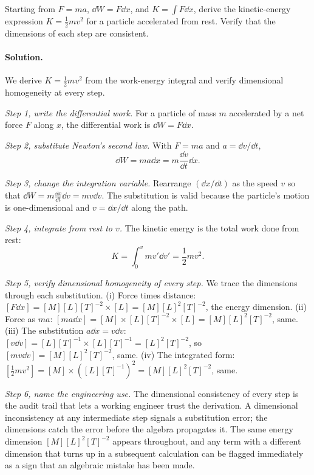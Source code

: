 \begin{exercise}
Starting from $F = ma$, $\dd W = F \dd x$, and $K = \int F \dd x$,
derive the kinetic-energy expression $K = \tfrac{1}{2} m v^{2}$ for
a particle accelerated from rest. Verify that the dimensions of each
step are consistent.

\paragraph{Solution.}
We derive $K = \tfrac{1}{2} m v^{2}$ from the work-energy integral and
verify dimensional homogeneity at every step.

\textit{Step 1, write the differential work.} For a particle of mass
$m$ accelerated by a net force $F$ along $x$, the differential work
is $\dd W = F \dd x$.

\textit{Step 2, substitute Newton's second law.} With $F = m a$ and
$a = \dd v / \dd t$,
\[
\dd W = m a \dd x = m \frac{\dd v}{\dd t} \dd x.
\]

\textit{Step 3, change the integration variable.} Rearrange
$(\dd x / \dd t)$ as the speed $v$ so that
$\dd W = m \frac{\dd x}{\dd t} \dd v = m v \dd v$.
The substitution is valid because the particle's motion is
one-dimensional and $v = \dd x/\dd t$ along the path.

\textit{Step 4, integrate from rest to $v$.} The kinetic energy is the
total work done from rest:
\[
K = \int_{0}^{v} m v' \dd v' = \frac{1}{2} m v^{2}.
\]

\textit{Step 5, verify dimensional homogeneity of every step.} We
trace the dimensions through each substitution. (i) Force times
distance: $[F\dd x] = [M][L][T]^{-2} \times [L] = [M][L]^{2}[T]^{-2}$,
the energy dimension. (ii) Force as $m a$: $[m a \dd x] = [M] \times
[L][T]^{-2} \times [L] = [M][L]^{2}[T]^{-2}$, same. (iii) The
substitution $a \dd x = v \dd v$: $[v \dd v] = [L][T]^{-1} \times
[L][T]^{-1} = [L]^{2}[T]^{-2}$, so $[m v \dd v] = [M][L]^{2}[T]^{-2}$,
same. (iv) The integrated form: $[\tfrac{1}{2} m v^{2}] = [M] \times
([L][T]^{-1})^{2} = [M][L]^{2}[T]^{-2}$, same.

\textit{Step 6, name the engineering use.} The dimensional consistency
of every step is the audit trail that lets a working engineer trust
the derivation. A dimensional inconsistency at any intermediate step
signals a substitution error; the dimensions catch the error before
the algebra propagates it. The same energy dimension
$[M][L]^{2}[T]^{-2}$ appears throughout, and any term with a different
dimension that turns up in a subsequent calculation can be flagged
immediately as a sign that an algebraic mistake has been made.
\end{exercise}

